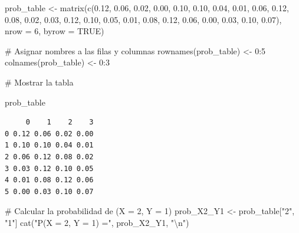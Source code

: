 \documentclass[
  a4paper,
  DIV=11,
  numbers=noendperiod]{scrreprt}
\newenvironment{Shaded}{\begin{snugshade}}{\end{snugshade}}
\newcommand{\AttributeTok}[1]{\textcolor[rgb]{0.40,0.45,0.13}{#1}}
\newcommand{\CommentTok}[1]{\textcolor[rgb]{0.37,0.37,0.37}{#1}}
\newcommand{\ConstantTok}[1]{\textcolor[rgb]{0.56,0.35,0.01}{#1}}
\newcommand{\DecValTok}[1]{\textcolor[rgb]{0.68,0.00,0.00}{#1}}
\newcommand{\FloatTok}[1]{\textcolor[rgb]{0.68,0.00,0.00}{#1}}
\newcommand{\FunctionTok}[1]{\textcolor[rgb]{0.28,0.35,0.67}{#1}}
\newcommand{\NormalTok}[1]{\textcolor[rgb]{0.00,0.23,0.31}{#1}}
\newcommand{\OtherTok}[1]{\textcolor[rgb]{0.00,0.23,0.31}{#1}}
\newcommand{\SpecialCharTok}[1]{\textcolor[rgb]{0.37,0.37,0.37}{#1}}
\newcommand{\StringTok}[1]{\textcolor[rgb]{0.13,0.47,0.30}{#1}}
\begin{document}
\begin{Shaded}
\begin{Highlighting}[]
\NormalTok{prob\_table }\OtherTok{\textless{}{-}} \FunctionTok{matrix}\NormalTok{(}\FunctionTok{c}\NormalTok{(}\FloatTok{0.12}\NormalTok{, }\FloatTok{0.06}\NormalTok{, }\FloatTok{0.02}\NormalTok{, }\FloatTok{0.00}\NormalTok{,}
                       \FloatTok{0.10}\NormalTok{, }\FloatTok{0.10}\NormalTok{, }\FloatTok{0.04}\NormalTok{, }\FloatTok{0.01}\NormalTok{,}
                       \FloatTok{0.06}\NormalTok{, }\FloatTok{0.12}\NormalTok{, }\FloatTok{0.08}\NormalTok{, }\FloatTok{0.02}\NormalTok{,}
                       \FloatTok{0.03}\NormalTok{, }\FloatTok{0.12}\NormalTok{, }\FloatTok{0.10}\NormalTok{, }\FloatTok{0.05}\NormalTok{,}
                       \FloatTok{0.01}\NormalTok{, }\FloatTok{0.08}\NormalTok{, }\FloatTok{0.12}\NormalTok{, }\FloatTok{0.06}\NormalTok{,}
                       \FloatTok{0.00}\NormalTok{, }\FloatTok{0.03}\NormalTok{, }\FloatTok{0.10}\NormalTok{, }\FloatTok{0.07}\NormalTok{), }
                     \AttributeTok{nrow =} \DecValTok{6}\NormalTok{, }\AttributeTok{byrow =} \ConstantTok{TRUE}\NormalTok{)}

\CommentTok{\# Asignar nombres a las filas y columnas}
\FunctionTok{rownames}\NormalTok{(prob\_table) }\OtherTok{\textless{}{-}} \DecValTok{0}\SpecialCharTok{:}\DecValTok{5}
\FunctionTok{colnames}\NormalTok{(prob\_table) }\OtherTok{\textless{}{-}} \DecValTok{0}\SpecialCharTok{:}\DecValTok{3}

\CommentTok{\# Mostrar la tabla}

\NormalTok{prob\_table}
\end{Highlighting}
\end{Shaded}

\begin{verbatim}
     0    1    2    3
0 0.12 0.06 0.02 0.00
1 0.10 0.10 0.04 0.01
2 0.06 0.12 0.08 0.02
3 0.03 0.12 0.10 0.05
4 0.01 0.08 0.12 0.06
5 0.00 0.03 0.10 0.07
\end{verbatim}

\begin{Shaded}
\begin{Highlighting}[]
\CommentTok{\# Calcular la probabilidad de (X = 2, Y = 1)}
\NormalTok{prob\_X2\_Y1 }\OtherTok{\textless{}{-}}\NormalTok{ prob\_table[}\StringTok{"2"}\NormalTok{, }\StringTok{"1"}\NormalTok{]}
\FunctionTok{cat}\NormalTok{(}\StringTok{"P(X = 2, Y = 1) ="}\NormalTok{, prob\_X2\_Y1, }\StringTok{"}\SpecialCharTok{\textbackslash{}n}\StringTok{"}\NormalTok{)}
\end{Highlighting}
\end{Shaded}
\end{document}
